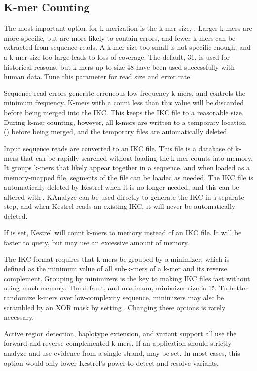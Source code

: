 \subsection{K-mer Counting}
\label{sec.process.kmers}

The most important option for k-merization is the k-mer size, . Larger k-mers are more specific, but are more likely to contain errors, and fewer k-mers can be extracted from sequence reads. A k-mer size too small is not specific enough, and a k-mer size too large leads to loss of coverage. The default, 31, is used for historical reasons, but k-mers up to size 48 have been used successfully with human data. Tune this parameter for read size and error rate.

Sequence read errors generate erroneous low-frequency k-mers, and  controls the minimum frequency. K-mers with a count less than this value will be discarded before being merged into the IKC. This keeps the IKC file to a reasonable size. During k-mer counting, however, all k-mers are written to a temporary location () before being merged, and the temporary files are automatically deleted.

Input sequence reads are converted to an IKC file. This file is a database of k-mers that can be rapidly searched without loading the k-mer counts into memory. It groups k-mers that likely appear together in a sequence, and when loaded as a memory-mapped file, segments of the file can be loaded as needed. The IKC file is automatically deleted by Kestrel when it is no longer needed, and this can be altered with . KAnalyze can be used directly to generate the IKC in a separate step, and when Kestrel reads an existing IKC, it will never be automatically deleted.

If  is set, Kestrel will count k-mers to memory instead of an IKC file. It will be faster to query, but may use an excessive amount of memory.

The IKC format requires that k-mers be grouped by a minimizer, which is defined as the minimum value of all sub-k-mers of a k-mer and its reverse complement. Grouping by minimizers is the key to making IKC files fast without using much memory. The default, and maximum, minimizer size is 15. To better randomize k-mers over low-complexity sequence, minimizers may also be scrambled by an XOR mask by setting . Changing these options is rarely necessary.

Active region detection, haplotype extension, and variant support all use the forward and reverse-complemented k-mers. If an application should strictly analyze and use evidence from a single strand,  may be set. In most cases, this option would only lower Kestrel's power to detect and resolve variants.

